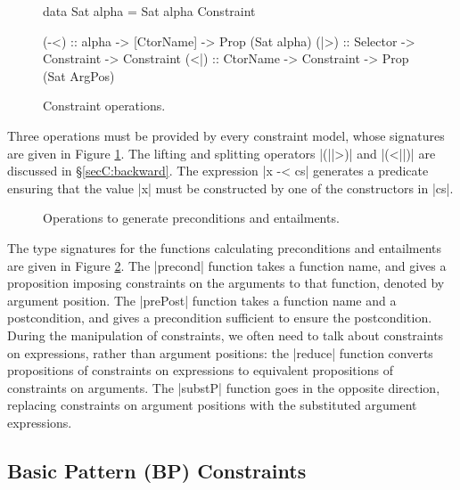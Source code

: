 \begin{figure}
\begin{code}
data Sat alpha = Sat alpha Constraint

(-<)  :: alpha -> [CtorName] -> Prop (Sat alpha)
(|>)  :: Selector -> Constraint -> Constraint
(<|)  :: CtorName -> Constraint -> Prop (Sat ArgPos)
\end{code}
\caption{Constraint operations.}
\label{figC:constraint}
\end{figure}

Three operations must be provided by every constraint model, whose signatures are given in Figure \ref{figC:constraint}. The lifting and splitting operators |(||>)| and |(<||)| are discussed in \S\ref{secC:backward}. The expression |x -< cs| generates a predicate ensuring that the value |x| must be constructed by one of the constructors in |cs|.

\begin{figure}
\caption{Operations to generate preconditions and entailments.}
\label{figC:operations}
\end{figure}

The type signatures for the functions calculating preconditions and entailments are given in Figure \ref{figC:operations}. The |precond| function takes a function name, and gives a proposition imposing constraints on the arguments to that function, denoted by argument position. The |prePost| function takes a function name and a postcondition, and gives a precondition sufficient to ensure the postcondition. During the manipulation of constraints, we often need to talk about constraints on expressions, rather than argument positions: the |reduce| function converts propositions of constraints on expressions to equivalent propositions of constraints on arguments. The |substP| function goes in the opposite direction, replacing constraints on argument positions with the substituted argument expressions.

\subsection{Basic Pattern (BP) Constraints}
\label{secC:basic}

